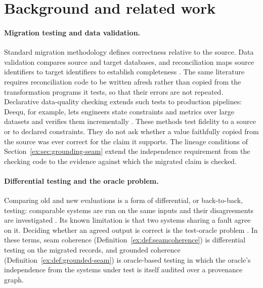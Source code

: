 \documentclass[smallextended,envcountsect,envcountsame,natbib]{svjour3}
\begin{document}
\section{Background and related work}\label{ex:sec:related}\label{ex:sec:formal-neighbours}

\paragraph{Migration testing and data validation.} Standard migration methodology defines correctness relative to the source. Data validation compares source and target databases, and reconciliation maps source identifiers to target identifiers to establish completeness \citep{matthesschulzhaller2011}. The same literature requires reconciliation code to be written afresh rather than copied from the transformation programs it tests, so that their errors are not repeated. Declarative data-quality checking extends such tests to production pipelines: Deequ, for example, lets engineers state constraints and metrics over large datasets and verifies them incrementally \citep{schelter2018}. These methods test fidelity to a source or to declared constraints. They do not ask whether a value faithfully copied from the source was ever correct for the claim it supports. The lineage conditions of Section~\ref{ex:sec:grounding-seam} extend the independence requirement from the checking code to the evidence against which the migrated claim is checked.

\paragraph{Differential testing and the oracle problem.} Comparing old and new evaluations is a form of differential, or back-to-back, testing: comparable systems are run on the same inputs and their disagreements are investigated \citep{mckeeman1998}. Its known limitation is that two systems sharing a fault agree on it. Deciding whether an agreed output is correct is the test-oracle problem \citep{barr2015}. In these terms, seam coherence (Definition~\ref{ex:def:seamcoherence}) is differential testing on the migrated records, and grounded coherence (Definition~\ref{ex:def:grounded-seam}) is oracle-based testing in which the oracle's independence from the systems under test is itself audited over a provenance graph.
\end{document}

